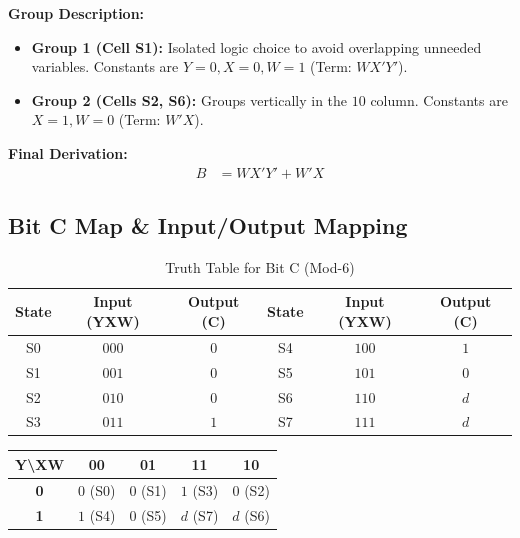 \documentclass[journal,12pt,onecolumn]{IEEEtran}
\begin{document}
		\begin{justify}
			\textbf{Group Description:}
			\begin{itemize}
				\item \textbf{Group 1 (Cell S1):} Isolated logic choice to avoid overlapping unneeded variables. Constants are $Y=0, X=0, W=1$ (Term: $WX'Y'$).
				\item \textbf{Group 2 (Cells S2, S6):} Groups vertically in the $10$ column. Constants are $X=1, W=0$ (Term: $W'X$).
			\end{itemize}
			
			\textbf{Final Derivation:}
			\begin{align}
				B &= WX'Y' + W'X
			\end{align}
		\end{justify}
		
		\vspace{1em}
		\subsection{Bit C Map \& Input/Output Mapping}
		
		\begin{table}[H]
			\centering
			\begin{tabular}{|c|c|c||c|c|c|}
				\hline
				\textbf{State} & \textbf{Input (YXW)} & \textbf{Output (C)} & \textbf{State} & \textbf{Input (YXW)} & \textbf{Output (C)} \\
				\hline
				S0 & $000$ & $0$ & S4 & $100$ & $1$ \\
				\hline
				S1 & $001$ & $0$ & S5 & $101$ & $0$ \\
				\hline
				S2 & $010$ & $0$ & S6 & $110$ & $d$ \\
				\hline
				S3 & $011$ & $1$ & S7 & $111$ & $d$ \\
				\hline
			\end{tabular}
			\caption{Truth Table for Bit C (Mod-6)}
		\end{table}
		
		\begin{table}[H]
			\centering
			\begin{tabular}{|c|c|c|c|c|}
				\hline
				\textbf{Y\textbackslash XW} & \textbf{00} & \textbf{01} & \textbf{11} & \textbf{10} \\
				\hline
				\textbf{0} & $0$ (S0) & $0$ (S1) & \cellcolor{grpGreen}$1$ (S3) & $0$ (S2) \\
				\hline
				\textbf{1} & \cellcolor{grpRed}$1$ (S4) & $0$ (S5) & \cellcolor{grpGreen}$d$ (S7) & \cellcolor{grpGreen}$d$ (S6) \\
				\hline
			\end{tabular}
		\end{table}
		
\end{document}
